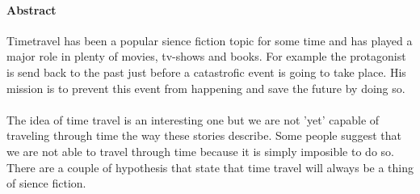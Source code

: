 \paragraph{Abstract} \label{par:Abstract}
Timetravel has been a popular sience fiction topic for some time and has played a major role in plenty of movies, tv-shows and books. For example the protagonist is send back to the past just before a catastrofic event is going to take place. His mission is to prevent this event from happening and save the future by doing so.
\paragraph{}
The idea of time travel is an interesting one but we are not 'yet' capable of traveling through time the way these stories describe. Some people suggest that we are not able to travel through time because it is simply imposible to do so. There are a couple of hypothesis that state that time travel will always be a thing of sience fiction.
